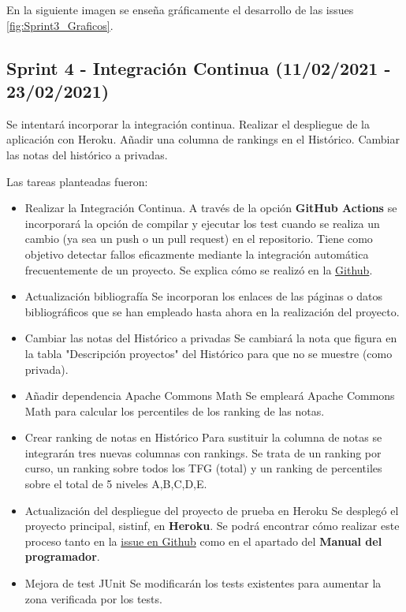 En la siguiente imagen se enseña gráficamente el desarrollo de las issues \ref{fig:Sprint3_Graficos}.


\subsection{Sprint 4 - Integración Continua (11/02/2021 - 23/02/2021)}
Se intentará incorporar la integración continua. Realizar el despliegue de la aplicación con Heroku. Añadir una columna de rankings en el Histórico. Cambiar las notas del histórico a privadas.

Las tareas planteadas fueron:
\begin{itemize}
	\tightlist
	\item Realizar la Integración Continua.
		A través de la opción \textbf{GitHub Actions} se incorporará la opción de compilar y ejecutar los test cuando se realiza un cambio (ya sea un push o un pull request) en el repositorio. Tiene como objetivo detectar fallos eficazmente mediante la integración automática frecuentemente de un proyecto. Se explica cómo se realizó en la \href{https://github.com/dbo1001/Gestor-TFG-2021/issues/37}{Github}.
	\item Actualización bibliografía
		Se incorporan los enlaces de las páginas o datos bibliográficos que se han empleado hasta ahora en la realización del proyecto.
	\item Cambiar las notas del Histórico a privadas
		Se cambiará la nota que figura en la tabla "Descripción proyectos" del Histórico para que no se muestre (como privada).
	\item Añadir dependencia Apache Commons Math
		Se empleará Apache Commons Math para calcular los percentiles de los ranking de las notas.
	\item Crear ranking de notas en Histórico
		Para sustituir la columna de notas se integrarán tres nuevas columnas con rankings. Se trata de un ranking por curso, un ranking sobre todos los TFG (total) y un ranking de percentiles sobre el total de 5 niveles A,B,C,D,E.
	\item Actualización del despliegue del proyecto de prueba en Heroku 
		Se desplegó el proyecto principal, sistinf, en \textbf{Heroku}. Se podrá encontrar cómo realizar este proceso tanto en la \href{https://github.com/dbo1001/Gestor-TFG-2021/issues/36}{issue en Github} como en el apartado del \textbf{Manual del programador}.
	\item Mejora de test JUnit
		Se modificarán los tests existentes para aumentar la zona verificada por los tests.
	
\end{itemize}

